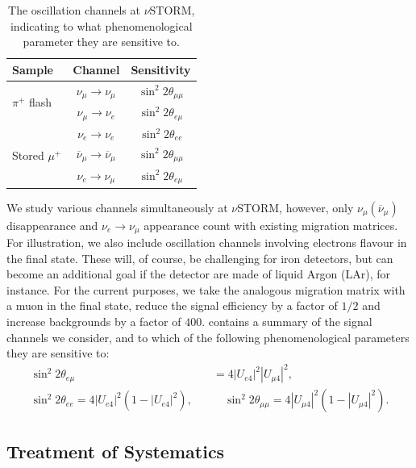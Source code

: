 %
\renewcommand{\arraystretch}{1.2}
\begin{table}[h]
\begin{tabular}{lcc}
\hline
Sample&Channel& Sensitivity\\
%
\hline\hline
%
\multirow{2}{*}{$\pi^+$ flash} & $\nu_{\mu} \to \nu_{\mu} $ & $\sin^2{2\theta_{\mu\mu}}$ \\
%
\cline{2-3}
%
&$\nu_{\mu} \to \nu_{e}$&$\sin^2{2\theta_{e\mu}}$\\
 \hline
\multirow{3}{*}{Stored $\mu^+ $} & $\nu_{e} \to \nu_{e}$&$\sin^2{2\theta_{ee}}$\\
%
\cline{2-3}
%
&$\overline{\nu}_{\mu} \to \overline{\nu}_{\mu}$&$\sin^2{2\theta_{\mu\mu}}$\\
%
\cline{2-3}
%
&$\nu_{e} \to \nu_{\mu}$ & $\sin^2{2\theta_{e\mu}}$ \\
\hline
\end{tabular}
\caption[Oscillation channels at $\nu$STORM.]{The oscillation channels at $\nu$STORM, indicating to what phenomenological parameter they are sensitive to.\label{tab:nustorm_channels}}
\end{table}


We study various channels simultaneously at $\nu$STORM, however, only $\nu_\mu (\overline{\nu}_\mu)$ disappearance and $\nu_e \to \nu_\mu$ appearance count with existing migration matrices. For illustration, we also include oscillation channels involving electrons flavour in the final state. These will, of course, be challenging for iron detectors, but can become an additional goal if the detector are made of liquid Argon (LAr), for instance. For the current purposes, we take the analogous migration matrix with a muon in the final state, reduce the signal efficiency by a factor of $1/2$ and increase backgrounds by a factor of $400$.  contains a summary of the signal channels we consider, and to which of the following phenomenological parameters they are sensitive to:
\begin{align}
 \sin^2{2\theta_{e\mu}} &= 4 |U_{e 4}|^2|U_{\mu 4}|^2,\nonumber\\ \sin^2{2\theta_{ee}} =  4|U_{e 4}|^2(1 -|U_{e 4}|^2), \quad&\quad \sin^2{2\theta_{\mu\mu}} =  4|U_{\mu 4}|^2(1 -|U_{\mu 4}|^2).
\end{align}



\subsection{Treatment of Systematics\label{sec:appendix_sys}}

